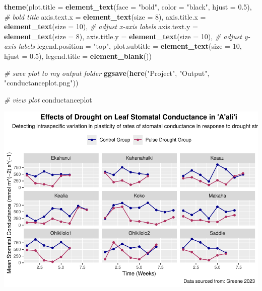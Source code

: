 \documentclass[
]{article}
\newenvironment{Shaded}{\begin{snugshade}}{\end{snugshade}}
\newcommand{\AttributeTok}[1]{\textcolor[rgb]{0.13,0.29,0.53}{#1}}
\newcommand{\CommentTok}[1]{\textcolor[rgb]{0.56,0.35,0.01}{\textit{#1}}}
\newcommand{\DecValTok}[1]{\textcolor[rgb]{0.00,0.00,0.81}{#1}}
\newcommand{\FloatTok}[1]{\textcolor[rgb]{0.00,0.00,0.81}{#1}}
\newcommand{\FunctionTok}[1]{\textcolor[rgb]{0.13,0.29,0.53}{\textbf{#1}}}
\newcommand{\NormalTok}[1]{#1}
\newcommand{\StringTok}[1]{\textcolor[rgb]{0.31,0.60,0.02}{#1}}
\begin{document}
\begin{Shaded}
\begin{Highlighting}[]
  \FunctionTok{theme}\NormalTok{(}\AttributeTok{plot.title =} \FunctionTok{element\_text}\NormalTok{(}\AttributeTok{face =} \StringTok{"bold"}\NormalTok{, }\AttributeTok{color =} \StringTok{"black"}\NormalTok{, }\AttributeTok{hjust =} \FloatTok{0.5}\NormalTok{), }\CommentTok{\# bold title}
        \AttributeTok{axis.text.x =} \FunctionTok{element\_text}\NormalTok{(}\AttributeTok{size =} \DecValTok{8}\NormalTok{), }\AttributeTok{axis.title.x =} \FunctionTok{element\_text}\NormalTok{(}\AttributeTok{size =} \DecValTok{10}\NormalTok{), }\CommentTok{\# adjust x{-}axis labels}
        \AttributeTok{axis.text.y =} \FunctionTok{element\_text}\NormalTok{(}\AttributeTok{size =} \DecValTok{8}\NormalTok{), }\AttributeTok{axis.title.y =} \FunctionTok{element\_text}\NormalTok{(}\AttributeTok{size =} \DecValTok{10}\NormalTok{),   }\CommentTok{\# adjust y{-}axis labels}
        \AttributeTok{legend.position =} \StringTok{"top"}\NormalTok{, }
        \AttributeTok{plot.subtitle =} \FunctionTok{element\_text}\NormalTok{(}\AttributeTok{size =} \DecValTok{10}\NormalTok{, }\AttributeTok{hjust =} \FloatTok{0.5}\NormalTok{), }
        \AttributeTok{legend.title =} \FunctionTok{element\_blank}\NormalTok{())}

\CommentTok{\# save plot to my output folder}
\FunctionTok{ggsave}\NormalTok{(}\FunctionTok{here}\NormalTok{(}\StringTok{"Project"}\NormalTok{, }\StringTok{"Output"}\NormalTok{, }\StringTok{"conductanceplot.png"}\NormalTok{)) }

\CommentTok{\# view plot}
\NormalTok{conductanceplot}
\end{Highlighting}
\end{Shaded}

\includegraphics{../Output/unnamed-chunk-1-1.pdf}
\end{document}
